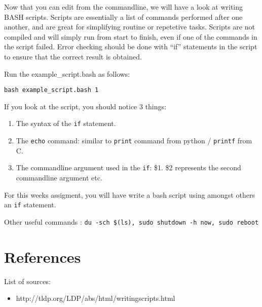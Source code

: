 \documentclass[a4paper]{article}
\begin{document}
Now that you can edit from the commandline, we will have a look at writing BASH scripts. Scripts are essentially a list of commands performed after one another, and are great for simplifying routine or repetetive tasks. Scripts are not compiled and will simply run from start to finish, even if one of the commands in the script failed. Error checking should be done with ``if'' statements in the script to ensure that the correct result is obtained. 

Run the example\_script.bash as follows:
\begin{lstlisting}
bash example_script.bash 1
\end{lstlisting}

If you look at the script, you should notice 3 things: 
\begin{enumerate}
\item The syntax of the \texttt{if} statement. 
\item The \texttt{echo} command: similar to \texttt{print} command from python / \texttt{printf} from C. 
\item The commandline argument used in the \texttt{if}: \$1. \$2 represents the second commandline argument etc. 
\end{enumerate}

For this weeks assigment, you will have write a bash script using amongst others an \texttt{if} statement. 


Other useful commands : \texttt{du -sch \$(ls), sudo shutdown -h now, sudo reboot}

\section{References}

List of sources:

\begin{itemize}
	
    \item http://tldp.org/LDP/abs/html/writingscripts.html
    
\end{itemize}
\end{document}
